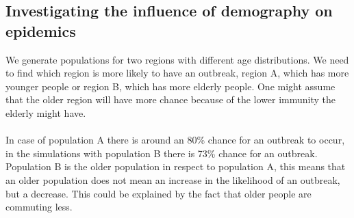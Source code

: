 \documentclass[runningheads]{llncs}
\begin{document}
	\subsection{Investigating the influence of demography on epidemics}
	We generate populations for two regions with different age distributions. We need to find which region is more likely to have an outbreak, region A, which has more younger people or region B, which has more elderly people. One might assume that the older region will have more chance because of the lower immunity the elderly might have.
	\\
	\\
	\noindent
	In case of population A there is around an 80\% chance for an outbreak to occur, in the simulations with population B there is 73\% chance for an outbreak. Population B is the older population in respect to population A, this means that an older population does not mean an increase in the likelihood of an outbreak, but a decrease. This could be explained by the fact that older people are commuting less.
	
\end{document}
